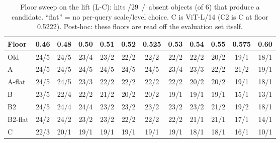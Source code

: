 \documentclass[11pt,a4paper]{article}
\begin{document}
\begin{table}[ht]
\centering\footnotesize
\setlength{\tabcolsep}{3.5pt}
\begin{tabular}{@{}l*{11}{c}@{}}
\toprule
Floor & 0.46 & 0.48 & 0.50 & 0.51 & 0.52 & 0.525 & 0.53 & 0.54 & \textbf{0.55} & 0.575 & 0.60 \\
\midrule
Old & 24/5 & 24/5 & 23/4 & 23/2 & 22/2 & 22/2 & 22/2 & 22/2 & 20/2 & 19/1 & 18/1 \\
A & 24/5 & 24/5 & 24/5 & 24/5 & 24/5 & 24/5 & 23/4 & 23/3 & 22/2 & 21/2 & 19/1 \\
A-flat & 24/5 & 24/5 & 23/3 & 22/2 & 22/2 & 22/2 & 22/2 & 20/2 & 20/2 & 19/1 & 18/1 \\
B & 23/5 & 22/4 & 22/2 & 21/2 & 20/2 & 20/2 & 19/1 & 19/1 & 19/1 & 15/1 & 13/1 \\
B2 & 24/5 & 24/4 & 24/4 & 23/2 & 23/2 & 23/2 & 23/2 & 23/2 & 21/2 & 19/2 & 18/1 \\
B2-flat & 24/2 & 24/2 & 23/2 & 23/2 & 22/2 & 22/2 & 22/2 & 21/1 & 21/1 & 17/1 & 14/1 \\
C & 22/3 & 20/1 & 19/1 & 19/1 & 19/1 & 19/1 & 19/1 & 18/1 & 18/1 & 16/1 & 10/1 \\

\bottomrule
\end{tabular}
\caption{Floor sweep on the lift (L-C): hits /29 \,/\, absent objects (of 6) that produce a candidate. ``flat'' = no
per-query scale/level choice. C is ViT-L/14 (C2 is C at floor 0.5222). Post-hoc: these floors are read off the evaluation
set itself.}
\label{tab:sweep}
\end{table}
\end{document}

